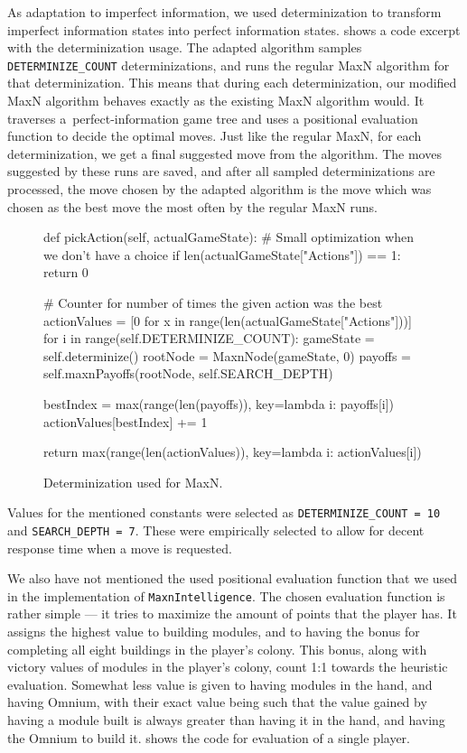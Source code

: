 As adaptation to imperfect information, we used determinization to transform
imperfect information states into perfect information states.
 shows a code excerpt with the determinization usage.
The adapted algorithm samples \texttt{DETERMINIZE\_COUNT} determinizations,
and runs the regular MaxN algorithm for that determinization. This means that during
each determinization, our modified MaxN algorithm behaves exactly as the existing
MaxN algorithm would. It traverses a~perfect-information game tree and uses a positional
evaluation function to decide the optimal moves. Just like the regular MaxN,
for each determinization, we get a final suggested move from the algorithm.
The moves suggested
by these runs are saved, and after all sampled determinizations are processed,
the move chosen by the adapted algorithm is the move which was chosen as the best
move the most often by the regular MaxN runs.

\begin{figure}[h!]
\begin{code}[commandchars=\\\{\},codes={\catcode`\$=3\catcode`\^=7\catcode`\_=8}]
def pickAction(self, actualGameState):
    \# Small optimization when we don't have a choice
    if len(actualGameState["Actions"]) == 1:
        return 0

    \# Counter for number of times the given action was the best
    actionValues = [0 for x in range(len(actualGameState["Actions"]))]
    for i in range(self.DETERMINIZE\_COUNT):
        gameState = self.determinize()
        rootNode = MaxnNode(gameState, 0)
        payoffs = self.maxnPayoffs(rootNode, self.SEARCH\_DEPTH)
        
        bestIndex = max(range(len(payoffs)), key=lambda i: payoffs[i])
        actionValues[bestIndex] += 1

    return max(range(len(actionValues)), key=lambda i: actionValues[i])
\end{code}
\caption{Determinization used for MaxN.}\label{algo:maxndet}
\end{figure}

Values for the mentioned constants were selected as \texttt{DETERMINIZE\_COUNT = 10}
and \texttt{SEARCH\_DEPTH = 7}. These were empirically selected to allow for decent
response time when a move is requested.

We also have not mentioned the used positional evaluation function that we used
in the implementation of \texttt{MaxnIntelligence}. The chosen evaluation function
is rather simple --- it tries to maximize the amount of points that the player has.
It assigns the highest value to building modules, and to having the bonus for completing
all eight buildings in the player's colony. This bonus, along with victory values of modules
in the player's colony, count 1:1 towards the heuristic evaluation. Somewhat less value is
given to having modules in the hand, and having Omnium, with their exact value being
such that the value gained by having a module built is always greater than having
it in the hand, and having the Omnium to build it.  shows
the code for evaluation of a single player.

